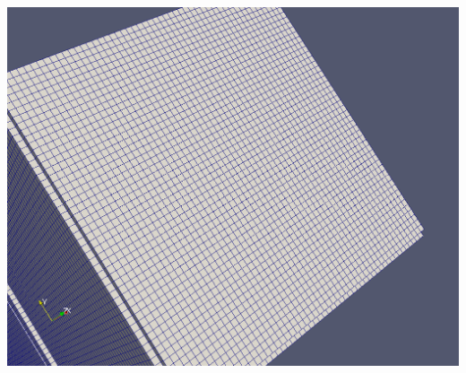 \documentclass[xcolor={usenames,dvipsnames,svgnames,table}]{beamer}
\begin{document}
{\begin{minipage}[h!]{0.4\textwidth}
        \newline
        \includegraphics[width=\textwidth]{png/markers/after-refinement.png}
    \end{minipage}
}
\end{document}
